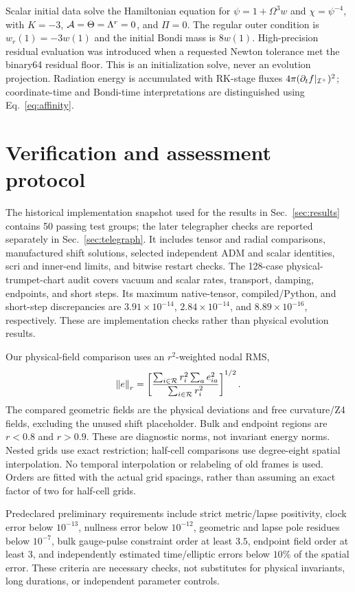 Scalar initial data solve the Hamiltonian equation for $\psi=1+\Omega^3w$ and $\chi=\psi^{-4}$, with $K=-3$, $\mathcal A=\Theta=\Lambda^r=0$, and $\Pi=0$. The regular outer condition is $w_r(1)=-3w(1)$ and the initial Bondi mass is $8w(1)$. High-precision residual evaluation was introduced when a requested Newton tolerance met the binary64 residual floor. This is an initialization solve, never an evolution projection. Radiation energy is accumulated with RK-stage fluxes $4\pi(\partial_tf|_{\mathcal I^+})^2$; coordinate-time and Bondi-time interpretations are distinguished using Eq.~\eqref{eq:affinity}.

\section{Verification and assessment protocol}
\label{sec:protocol}
The historical implementation snapshot used for the results in Sec.~\ref{sec:results} contains 50 passing test groups; the later telegrapher checks are reported separately in Sec.~\ref{sec:telegraph}. It includes tensor and radial comparisons, manufactured shift solutions, selected independent ADM and scalar identities, scri and inner-end limits, and bitwise restart checks. The 128-case physical-trumpet-chart audit covers vacuum and scalar rates, transport, damping, endpoints, and short steps. Its maximum native-tensor, compiled/Python, and short-step discrepancies are $3.91\times10^{-14}$, $2.84\times10^{-14}$, and $8.89\times10^{-16}$, respectively. These are implementation checks rather than physical evolution results.

Our physical-field comparison uses an $r^2$-weighted nodal RMS,
\begin{equation}
 \left\|e\right\|_r=\left[\frac{\sum_{i\in\mathcal R}r_i^2
 \sum_a e_{ia}^2}{\sum_{i\in\mathcal R}r_i^2}\right]^{1/2}.
\end{equation}
The compared geometric fields are the physical deviations and free curvature/Z4 fields, excluding the unused shift placeholder. Bulk and endpoint regions are $r<0.8$ and $r>0.9$. These are diagnostic norms, not invariant energy norms. Nested grids use exact restriction; half-cell comparisons use degree-eight spatial interpolation. No temporal interpolation or relabeling of old frames is used. Orders are fitted with the actual grid spacings, rather than assuming an exact factor of two for half-cell grids.

Predeclared preliminary requirements include strict metric/lapse positivity, clock error below $10^{-13}$, nullness error below $10^{-12}$, geometric and lapse pole residues below $10^{-7}$, bulk gauge-pulse constraint order at least $3.5$, endpoint field order at least $3$, and independently estimated time/elliptic errors below $10\%$ of the spatial error. These criteria are necessary checks, not substitutes for physical invariants, long durations, or independent parameter controls.

